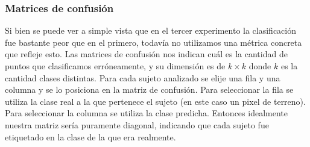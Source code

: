 \subsubsection{Matrices de confusión}
Si bien se puede ver a simple vista que en el tercer experimento la clasificación fue bastante peor que en el primero, todavía no utilizamos una métrica concreta que refleje esto. Las matrices de confusión nos indican cuál es la cantidad de puntos que clasificamos erróneamente, y su dimensión es de $k \times k$ donde $k$ es la cantidad clases distintas. Para cada sujeto analizado se elije una fila y una columna y se lo posiciona en la matriz de confusión. Para seleccionar la fila se utiliza la clase real a la que pertenece el sujeto (en este caso un pixel de terreno). Para seleccionar la columna se utiliza la clase predicha. Entonces idealmente nuestra matriz sería puramente diagonal, indicando que cada sujeto fue etiquetado en la clase de la que era realmente. 


